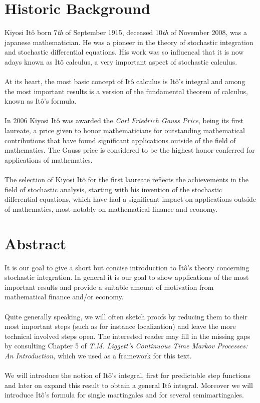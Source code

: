\documentclass[11pt,a4paper, final]{article}
\theoremstyle{definition}
\begin{document}
\section{Historic Background}




Kiyosi Itô born 7\textit{th} of September 1915, deceased 10\textit{th} of November 2008, was a japanese mathematician. He was a pioneer in the theory of stochastic integration and stochastic differential equations. His work was so influencal that it is now adays known as Itô calculus, a very important aspect of stochastic calculus. 
\\\\
At its heart, the most basic concept of Itô calculus is Itô's integral and among the most important results is a version of the fundamental theorem of calculus, known as Itô's formula.
\\\\
In 2006 Kiyosi Itô was awarded the \textit{Carl Friedrich Gauss Price}, being its first laureate, a price given to honor mathematicians for outstanding mathematical contributions that have found significant applications outside of the field of mathematics. The Gauss price is considered to be the highest honor conferred for applications of mathematics.
\\
\\
The selection of Kiyosi Itô for the first laureate reflects the achievements in the field of stochastic analysis, starting with his invention of the stochastic differential equations, which have had a significant impact on applications outside of mathematics, most notably on mathematical finance and economy. 
\section{Abstract}
It is our goal to give a short but concise introduction to Itô's theory concerning stochastic integration. In general it is our goal to show applications of the most important results and provide a suitable amount of motivation from mathematical finance and/or economy. 
\\\\
Quite generally speaking, we will often sketch proofs by reducing them to their most important steps (such as for instance localization) and leave the more technical involved steps open. The interested reader may fill in the missing gaps by consulting  Chapter 5 of \textit{T.M. Liggett's Continuous Time Markov Processes: An Introduction,} which we used as a framework for this text. 
\\\\
We will introduce the notion of Itô's integral, first for predictable step functions and later on expand this result to obtain a general Itô integral. Moreover we will introduce Itô's formula for single martingales and for several semimartingales.
\newpage  
\end{document}
